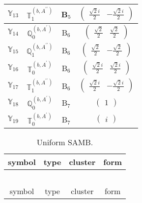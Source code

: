 \documentclass[fleqn,10pt,landscape]{article}
\begin{document}
\begin{itemize}
\begin{center}
\begin{longtable}{c|c|c|c}
$ \mathbb{Y}_{13} $ & $\mathbb{T}_{1}^{(b,A^{\prime\prime})}$ & B$_{5}$ & $\begin{pmatrix} \frac{\sqrt{2} i}{2} & - \frac{\sqrt{2} i}{2} \end{pmatrix}$ \\ \hline
$ \mathbb{Y}_{14} $ & $\mathbb{Q}_{0}^{(b,A^{\prime})}$ & B$_{6}$ & $\begin{pmatrix} \frac{\sqrt{2}}{2} & \frac{\sqrt{2}}{2} \end{pmatrix}$ \\
$ \mathbb{Y}_{15} $ & $\mathbb{Q}_{1}^{(b,A^{\prime\prime})}$ & B$_{6}$ & $\begin{pmatrix} \frac{\sqrt{2}}{2} & - \frac{\sqrt{2}}{2} \end{pmatrix}$ \\
$ \mathbb{Y}_{16} $ & $\mathbb{T}_{0}^{(b,A^{\prime})}$ & B$_{6}$ & $\begin{pmatrix} \frac{\sqrt{2} i}{2} & \frac{\sqrt{2} i}{2} \end{pmatrix}$ \\
$ \mathbb{Y}_{17} $ & $\mathbb{T}_{1}^{(b,A^{\prime\prime})}$ & B$_{6}$ & $\begin{pmatrix} \frac{\sqrt{2} i}{2} & - \frac{\sqrt{2} i}{2} \end{pmatrix}$ \\ \hline
$ \mathbb{Y}_{18} $ & $\mathbb{Q}_{0}^{(b,A^{\prime})}$ & B$_{7}$ & $\begin{pmatrix} 1 \end{pmatrix}$ \\
$ \mathbb{Y}_{19} $ & $\mathbb{T}_{0}^{(b,A^{\prime})}$ & B$_{7}$ & $\begin{pmatrix} i \end{pmatrix}$ \\
\end{longtable}
\end{center}
\begin{center}
\renewcommand{\arraystretch}{1.3}
\begin{longtable}{c|c|c|c}
\caption{Uniform SAMB.}
 \\
 \hline \hline
symbol & type & cluster & form \\ \hline \endfirsthead

\multicolumn{3}{l}{\tablename\ \thetable{}} \\
 \hline \hline
symbol & type & cluster & form \\ \hline \endhead


\end{longtable}
\end{center}
\end{itemize}
\end{document}

